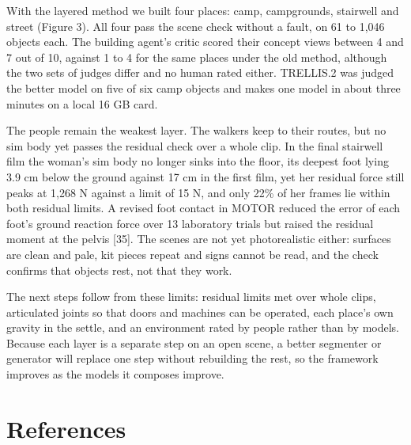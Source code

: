 \documentclass[
  11pt,
]{article}
\begin{document}
With the layered method we built four places: camp, campgrounds,
stairwell and street (Figure 3). All four pass the scene check without a
fault, on 61 to 1,046 objects each. The building agent's critic scored
their concept views between 4 and 7 out of 10, against 1 to 4 for the
same places under the old method, although the two sets of judges differ
and no human rated either. TRELLIS.2 was judged the better model on five
of six camp objects and makes one model in about three minutes on a
local 16 GB card.

The people remain the weakest layer. The walkers keep to their routes,
but no sim body yet passes the residual check over a whole clip. In the
final stairwell film the woman's sim body no longer sinks into the
floor, its deepest foot lying 3.9 cm below the ground against 17 cm in
the first film, yet her residual force still peaks at 1,268 N against a
limit of 15 N, and only 22\% of her frames lie within both residual
limits. A revised foot contact in MOTOR reduced the error of each foot's
ground reaction force over 13 laboratory trials but raised the residual
moment at the pelvis {[}35{]}. The scenes are not yet photorealistic
either: surfaces are clean and pale, kit pieces repeat and signs cannot
be read, and the check confirms that objects rest, not that they work.

The next steps follow from these limits: residual limits met over whole
clips, articulated joints so that doors and machines can be operated,
each place's own gravity in the settle, and an environment rated by
people rather than by models. Because each layer is a separate step on
an open scene, a better segmenter or generator will replace one step
without rebuilding the rest, so the framework improves as the models it
composes improve.

\section*{References}\label{references}
\end{document}
